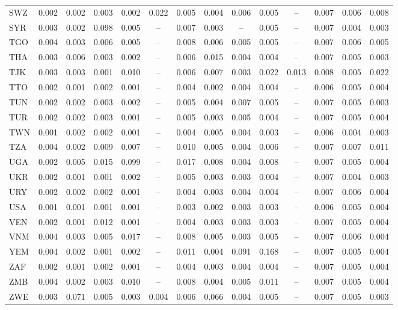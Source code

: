 \begin{longtable}{l*{13}{c}}
SWZ & 0.002 & 0.002 & 0.003 & 0.002 & 0.022 & 0.005 & 0.004 & 0.006 & 0.005 & -- & 0.007 & 0.006 & 0.008 \\
SYR & 0.003 & 0.002 & 0.098 & 0.005 & -- & 0.007 & 0.003 & -- & 0.005 & -- & 0.007 & 0.004 & 0.003 \\
TGO & 0.004 & 0.003 & 0.006 & 0.005 & -- & 0.008 & 0.006 & 0.005 & 0.005 & -- & 0.007 & 0.006 & 0.005 \\
THA & 0.003 & 0.006 & 0.003 & 0.002 & -- & 0.006 & 0.015 & 0.004 & 0.004 & -- & 0.007 & 0.005 & 0.003 \\
TJK & 0.003 & 0.003 & 0.001 & 0.010 & -- & 0.006 & 0.007 & 0.003 & 0.022 & 0.013 & 0.008 & 0.005 & 0.022 \\
TTO & 0.002 & 0.001 & 0.002 & 0.001 & -- & 0.004 & 0.002 & 0.004 & 0.004 & -- & 0.006 & 0.005 & 0.004 \\
TUN & 0.002 & 0.002 & 0.003 & 0.002 & -- & 0.005 & 0.004 & 0.007 & 0.005 & -- & 0.007 & 0.005 & 0.003 \\
TUR & 0.002 & 0.002 & 0.003 & 0.001 & -- & 0.005 & 0.003 & 0.005 & 0.004 & -- & 0.007 & 0.005 & 0.004 \\
TWN & 0.001 & 0.002 & 0.002 & 0.001 & -- & 0.004 & 0.005 & 0.004 & 0.003 & -- & 0.006 & 0.004 & 0.003 \\
TZA & 0.004 & 0.002 & 0.009 & 0.007 & -- & 0.010 & 0.005 & 0.004 & 0.006 & -- & 0.007 & 0.007 & 0.011 \\
UGA & 0.002 & 0.005 & 0.015 & 0.099 & -- & 0.017 & 0.008 & 0.004 & 0.008 & -- & 0.007 & 0.005 & 0.004 \\
UKR & 0.002 & 0.001 & 0.001 & 0.002 & -- & 0.005 & 0.003 & 0.003 & 0.004 & -- & 0.007 & 0.004 & 0.003 \\
URY & 0.002 & 0.002 & 0.002 & 0.001 & -- & 0.004 & 0.003 & 0.004 & 0.004 & -- & 0.007 & 0.006 & 0.004 \\
USA & 0.001 & 0.001 & 0.001 & 0.001 & -- & 0.003 & 0.002 & 0.003 & 0.003 & -- & 0.006 & 0.005 & 0.004 \\
VEN & 0.002 & 0.001 & 0.012 & 0.001 & -- & 0.004 & 0.003 & 0.003 & 0.003 & -- & 0.007 & 0.005 & 0.004 \\
VNM & 0.004 & 0.003 & 0.005 & 0.017 & -- & 0.008 & 0.005 & 0.003 & 0.005 & -- & 0.007 & 0.006 & 0.004 \\
YEM & 0.004 & 0.002 & 0.001 & 0.002 & -- & 0.011 & 0.004 & 0.091 & 0.168 & -- & 0.007 & 0.005 & 0.004 \\
ZAF & 0.002 & 0.001 & 0.002 & 0.001 & -- & 0.004 & 0.003 & 0.004 & 0.004 & -- & 0.007 & 0.005 & 0.004 \\
ZMB & 0.004 & 0.002 & 0.003 & 0.010 & -- & 0.008 & 0.004 & 0.005 & 0.011 & -- & 0.007 & 0.005 & 0.004 \\
ZWE & 0.003 & 0.071 & 0.005 & 0.003 & 0.004 & 0.006 & 0.066 & 0.004 & 0.005 & -- & 0.007 & 0.005 & 0.003 \\
\bottomrule
\end{longtable}
